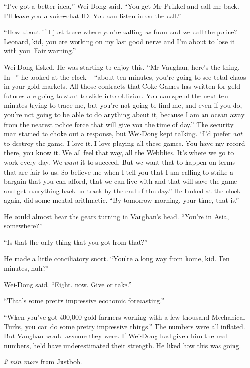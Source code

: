 ``I've got a better idea,'' Wei-Dong said. ``You get Mr Prikkel and
call me back. I'll leave you a voice-chat ID. You can listen in on
the call.''

``How about if I just trace where you're calling \emph{us} from and
we call the police? Leonard, kid, you are working on my last good
nerve and I'm about to lose it with you. Fair warning.''

Wei-Dong tisked. He was starting to enjoy this. ``Mr Vaughan, here's
the thing. In --'' he looked at the clock -- ``about ten minutes,
you're going to see total chaos in your gold markets. All those
contracts that Coke Games has written for gold futures are going to
start to slide into oblivion. You can spend the next ten minutes
trying to trace me, but you're not going to find me, and even if
you do, you're not going to be able to do anything about it,
because I am an ocean away from the nearest police force that will
give you the time of day.'' The security man started to choke out a
response, but Wei-Dong kept talking. ``I'd prefer \emph{not} to
destroy the game. I love it. I love playing all these games. You
have my record there, you know it. We all feel that way, all the
Webblies. It's where we go to work every day. We \emph{want} it to
succeed. But we want that to happen on terms that are fair to us.
So believe me when I tell you that I am calling to strike a bargain
that you can afford, that we can live with and that will save the
game and get everything back on track by the end of the day.'' He
looked at the clock again, did some mental arithmetic. ``By tomorrow
morning, your time, that is.''

He could almost hear the gears turning in Vaughan's head. ``You're
in Asia, somewhere?''

``Is that the only thing that you got from that?''

He made a little conciliatory snort. ``You're a long way from home,
kid. Ten minutes, huh?''

Wei-Dong said, ``Eight, now. Give or take.''

``That's some pretty impressive economic forecasting.''

``When you've got 400,000 gold farmers working with a few thousand
Mechanical Turks, you can do some pretty impressive things.'' The
numbers were all inflated. But Vaughan would assume they were. If
Wei-Dong had given him the real numbers, he'd have underestimated
their strength. He liked how this was going.

\emph{2 min more} from Justbob.

